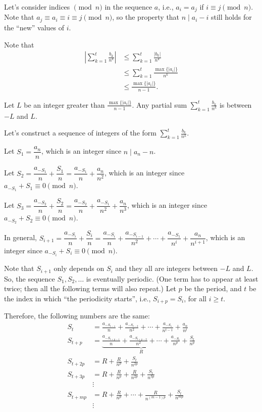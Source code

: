 Let's consider indices $\pmod{n}$ in the sequence $a$, i.e., $a_i = a_j$ if $i \equiv j \pmod{n}$.
Note that $a_j \equiv a_i \equiv i \equiv j \pmod{n}$, so the property that $n \mid a_i - i$ still holds for the ``new'' values of $i$.

Note that 
\begin{align*}
	\left| \sum_{k=1}^t \frac{b_k}{n^k} \right|
	& \leq \sum_{k=1}^t \frac{\left|b_k\right|}{n^k} \\ 
	& \leq \sum_{k=1}^t \frac{\max\{\left| a_i \right|\}}{n^k} \\
	& \leq \frac{\max\{\left| a_i \right|\}}{n - 1}.
\end{align*}

Let $L$ be an integer greater than $\frac{\max\{\left| a_i \right|\}}{n - 1}$. Any partial sum $\sum_{k=1}^t\frac{b_k}{n^k}$ is between $-L$ and $L$.

Let's construct a sequence of integers of the form $\sum_{k=1}^t \frac{b_k}{n^k}$.

Let $S_1 = \dfrac{a_n}{n}$, which is an integer since $n \mid a_n - n$.

Let $S_2 = \dfrac{a_{-S_1}}{n} + \dfrac{S_1}{n} = \dfrac{a_{-S_1}}{n} + \dfrac{a_n}{n^2}$, which is an integer since $a_{-S_1} + S_1 \equiv 0 \pmod{n}$.

Let $S_3 = \dfrac{a_{-S_2}}{n} + \dfrac{S_2}{n} = \dfrac{a_{-S_2}}{n} + \dfrac{a_{-S_1}}{n^2} + \dfrac{a_n}{n^3}$, which is an integer since $a_{-S_2} + S_2 \equiv 0 \pmod{n}$.

In general, $S_{i+1} = \dfrac{a_{-S_{i}}}{n} + \dfrac{S_{i}}{n} =
\dfrac{a_{-S_i}}{n} + \dfrac{a_{-S_{i-1}}}{n^2} + \cdots + \dfrac{a_{-S_{1}}}{n^{i}} + \dfrac{a_n}{n^{i+1}}$, which is an integer since $a_{-S_i} + S_i \equiv 0 \pmod{n}$.

Note that $S_{i+1}$ only depends on $S_i$ and they all are integers between $-L$ and $L$. So, the sequence $S_1, S_2, \dots$ is eventually periodic. (One term has to appear at least twice; then all the following terms will also repeat.)
Let $p$ be the period, and $t$ be the index in which ``the periodicity starts'', i.e., $S_{i+p} = S_i$, for all  $i \geq t$.

Therefore, the following numbers are the same:
\begin{align*}
	S_t &= \frac{a_{-S_{t-1}}}{n} + \frac{a_{-S_{t-2}}}{n^2} + \cdots + \frac{a_{-S_1}}{n^{t-1}} + \frac{a_n}{n^t} \\ 
	S_{t+p} &= \underbrace{\frac{a_{-S_{{t+p}-1}}}{n} + \frac{a_{-S_{{t+p}-2}}}{n^2} + \cdots + \frac{a_{-S_{t}}}{n^{p}}}_{R} + \frac{S_t}{n^p}\\ 
	S_{t+2p} &= R + \frac{R}{n^p} + \frac{S_t}{n^{2p}}\\
	S_{t+3p} &= R + \frac{R}{n^p} + \frac{R}{n^{2p}}+ \frac{S_t}{n^{3p}}\\
	&\vdots\\
	S_{t+mp} &= R + \frac{R}{n^p} + \cdots + \frac{R}{n^{(m-1)p}}+ \frac{S_t}{n^{mp}}\\
	&\vdots
\end{align*}

